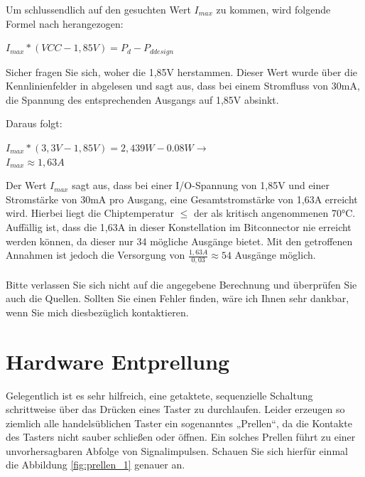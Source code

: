 \documentclass{article}
\begin{document}
Um schlussendlich auf den gesuchten Wert $I_{max}$ zu kommen, wird folgende Formel nach \autocite[16]{XC95_maxI} herangezogen:

\begin{center}
	$I_{max} * (VCC - 1,85V) = P_d - P_{ddesign}$
\end{center}

Sicher fragen Sie sich, woher die 1,85V herstammen. Dieser Wert wurde über die Kennlinienfelder in \autocite[6]{XC_Curves} abgelesen und sagt aus, dass bei einem Stromfluss von 30mA, die Spannung des entsprechenden Ausgangs auf 1,85V absinkt.

Daraus folgt: 
\begin{center}
	$I_{max} * (3,3V - 1,85V) = 2,439 W - 0.08W \rightarrow$\\
	\underline{\underline{$I_{max}\approx 1,63A $}}
\end{center}
Der Wert $I_{max}$ sagt aus, dass bei einer I/O-Spannung von 1,85V und einer Stromstärke von 30mA pro Ausgang, eine Gesamtstromstärke von 1,63A erreicht wird. Hierbei liegt die Chiptemperatur $\leq $ der als kritisch angenommenen 70$\si{\celsius}$. Auffällig ist, dass die 1,63A in dieser Konstellation im Bitconnector nie erreicht werden können, da dieser nur 34 mögliche Ausgänge bietet. Mit den getroffenen Annahmen ist jedoch die Versorgung von $\frac{1,63A}{0,03}\approx54$ Ausgänge möglich.\\\\
Bitte verlassen Sie sich nicht auf die angegebene Berechnung und überprüfen Sie auch die Quellen. Sollten Sie einen Fehler finden, wäre ich Ihnen sehr dankbar, wenn Sie mich diesbezüglich kontaktieren.

\section{Hardware Entprellung}
Gelegentlich ist es sehr hilfreich, eine getaktete, sequenzielle Schaltung schrittweise über das Drücken eines Taster zu durchlaufen. Leider erzeugen so ziemlich alle handelsüblichen Taster ein sogenanntes „Prellen“, da die Kontakte des Tasters nicht sauber schließen oder öffnen. Ein solches Prellen führt zu einer unvorhersagbaren Abfolge von Signalimpulsen. Schauen Sie sich hierfür einmal die Abbildung \ref{fig:prellen_1} genauer an. 
\end{document}
